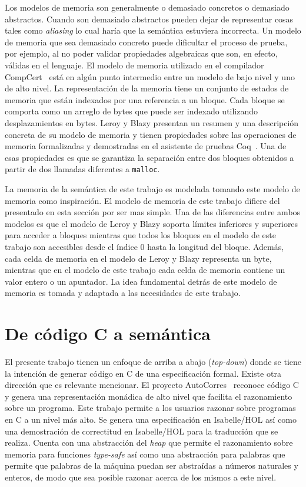 Los modelos de memoria son generalmente o demasiado concretos o demasiado abstractos.
Cuando son demasiado abstractos pueden dejar de representar cosas tales como \textit{aliasing} lo cual haría que la semántica estuviera incorrecta.
Un modelo de memoria que sea demasiado concreto puede dificultar el proceso de prueba, por ejemplo, al no poder validar propiedades algebraicas que son, en efecto, válidas en el lenguaje.
El modelo de memoria utilizado en el compilador CompCert~\cite{leroy-blazy-memory-model} está en algún punto intermedio entre un modelo de bajo nivel y uno de alto nivel.
La representación de la memoria tiene un conjunto de estados de memoria que están indexados por una referencia a un bloque.
Cada bloque se comporta como un arreglo de bytes que puede ser indexado utilizando desplazamientos en bytes.
Leroy y Blazy presentan un resumen y una descripción concreta de su modelo de memoria y tienen propiedades sobre las operaciones de memoria formalizadas y demostradas en el asistente de pruebas Coq~\cite{coq-doc}.
Una de esas propiedades es que se garantiza la separación entre dos bloques obtenidos a partir de dos llamadas diferentes a \verb|malloc|.

La memoria de la semántica de este trabajo es modelada tomando este modelo de memoria como inspiración.
El modelo de memoria de este trabajo difiere del presentado en esta sección por ser mas simple.
Una de las diferencias entre ambos modelos es que el modelo de Leroy y Blazy soporta límites inferiores y superiores para acceder a bloques mientras que todos los bloques en el modelo de este trabajo son accesibles desde el índice $0$ hasta la longitud del bloque.
Además, cada celda de memoria en el modelo de Leroy y Blazy representa un byte, mientras que en el modelo de este trabajo cada celda de memoria contiene un valor entero o un apuntador.
La idea fundamental detrás de este modelo de memoria es tomada y adaptada a las necesidades de este trabajo.


\section{De código C a semántica}

El presente trabajo tienen un enfoque de arriba a abajo (\textit{top-down}) donde se tiene la intención de generar código en C de una especificación formal.
Existe otra dirección que es relevante mencionar.
El proyecto AutoCorres~\cite{autocorres} reconoce código C y genera una representación monádica de alto nivel que facilita el razonamiento sobre un programa.
Este trabajo permite a los usuarios razonar sobre programas en C a un nivel más alto.
Se genera una especificación en Isabelle/HOL así como una demostración de correctitud en Isabelle/HOL para la traducción que se realiza.
Cuenta con una abstracción del \textit{heap} que permite el razonamiento sobre memoria para funciones \textit{type-safe} así como una abstracción para palabras que permite que palabras de la máquina puedan ser abstraídas a números naturales y enteros, de modo que sea posible razonar acerca de los mismos a este nivel.

